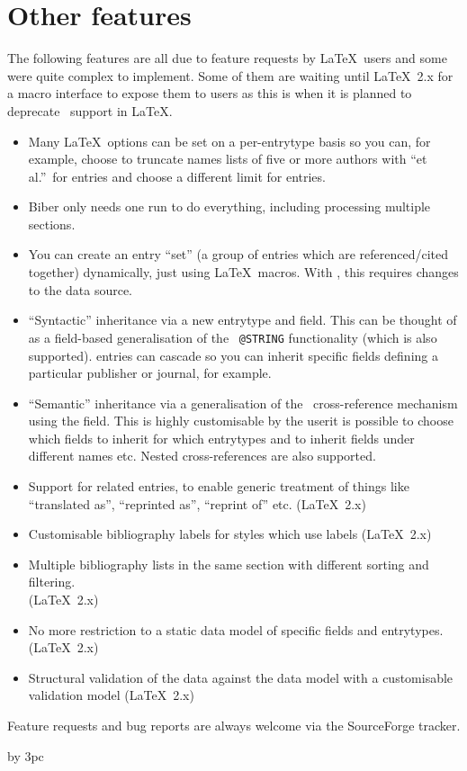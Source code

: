 \documentclass[final]{ltugboat}
\def\BibLaTeX{\Bib\LaTeX}
\begin{document}
\section{Other features}

The following features are all due to feature requests by \BibLaTeX\
users and some were quite complex to implement. Some of them are
waiting until \BibLaTeX~2.x for a macro interface to expose them to
users as this is when it is planned to deprecate \BibTeX\ support in
\BibLaTeX.

\hfuzz=1.1pt 
\begin{itemize}
\item Many \BibLaTeX\ options can be set on a per-entrytype basis so you
 can, for example, choose to truncate names lists of five or more authors
with ``et al.''\ for \acro{BOOK} entries and choose a different limit
for \acro{ARTICLE} entries.
\newpage
\item Biber only needs one run to do everything, including processing
 multiple sections.
\item You can create an entry ``set'' (a group of entries which are
 referenced/cited together) dynamically, just using \BibLaTeX\
 macros. With \BibTeX, this requires changes to the data source.
\item ``Syntactic'' inheritance via a new  entrytype and
 field. This can be thought of as a field-based generalisation of the
 \BibTeX\ \verb+@STRING+ functionality (which is also
 supported). \acro{XDATA} entries can cascade so you can inherit
 specific fields defining a particular publisher or journal, for
 example.
\item ``Semantic'' inheritance via a generalisation of the \BibTeX\
 cross-reference mechanism using the  field. This is
 highly customisable by the user\Dash{}it is possible to choose which
 fields to inherit for which entrytypes and to inherit fields under
 different names etc. Nested cross-references are also supported.
\item Support for related entries, to enable generic treatment of things
 like ``translated as'', ``reprint\-ed as'', ``reprint of''
 etc. (\BibLaTeX\ 2.x)
\item Customisable bibliography labels for styles which use labels
 (\BibLaTeX\ 2.x)
\item Multiple bibliography lists in the same section with different
 sorting and filtering.\\(\BibLaTeX~2.x)
\item No more restriction to a static data model of specific fields and
 entrytypes. (\BibLaTeX~2.x)
\item Structural validation of the data against the data model with a
 customisable validation model (\BibLaTeX\ 2.x)
\end{itemize}

\smallskip
\noindent Feature requests and bug reports are always welcome via the
SourceForge tracker.

\bigskip
\advance\signaturewidth by 3pc
\makesignature
\end{document}
